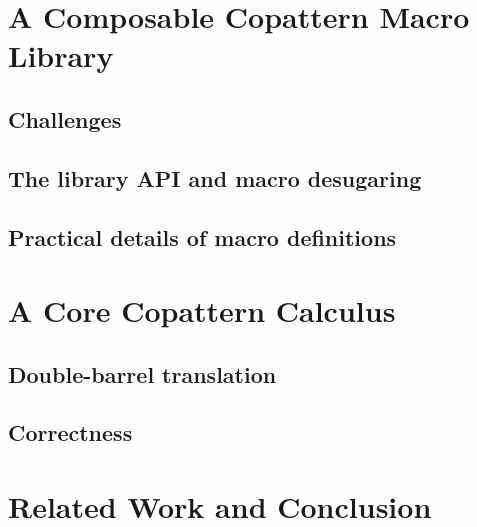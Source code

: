 \documentclass[runningheads]{llncs}
\begin{document}
\section{A Composable Copattern Macro Library}
\label{sec-api}

\subsection{Challenges}


\subsection{The library API and macro desugaring}
\label{sec-desugaring}


\subsection{Practical details of macro definitions}
\label{sec-macro}


\section{A Core Copattern Calculus}
\label{sec-translation}

\subsection{Double-barrel translation}


\subsection{Correctness}
\label{sec-correctness}



% 

\section{Related Work and Conclusion} \label{sec-related-work}



\end{document}
